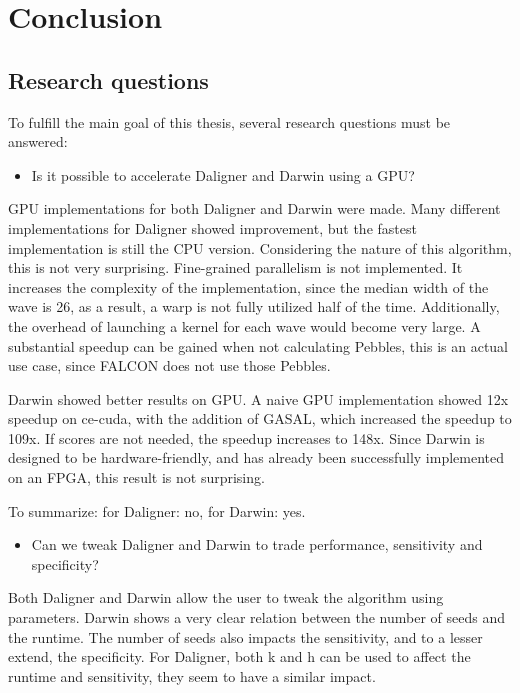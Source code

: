 \documentclass[../thesis.tex]{subfiles}
\begin{document}
\chapter{Conclusion}
\ifdefined\main
\else

\fi


% 

\section{Research questions}
To fulfill the main goal of this thesis, several research questions must be answered:

\begin{itemize}
\item Is it possible to accelerate Daligner and Darwin using a GPU?
\end{itemize}
GPU implementations for both Daligner and Darwin were made.
Many different implementations for Daligner showed improvement, but the fastest implementation is still the CPU version.
Considering the nature of this algorithm, this is not very surprising.
Fine-grained parallelism is not implemented.
It increases the complexity of the implementation, since the median width of the wave is 26, as a result, a warp is not fully utilized half of the time.
Additionally, the overhead of launching a kernel for each wave would become very large.
A substantial speedup can be gained when not calculating Pebbles, this is an actual use case, since FALCON does not use those Pebbles.

Darwin showed better results on GPU.
A naive GPU implementation showed 12x speedup on ce-cuda, with the addition of GASAL, which increased the speedup to 109x.
If scores are not needed, the speedup increases to 148x.
Since Darwin is designed to be hardware-friendly, and has already been successfully implemented on an FPGA, this result is not surprising.

To summarize: for Daligner: no, for Darwin: yes.


\begin{itemize}
\item Can we tweak Daligner and Darwin to trade performance, sensitivity and specificity?
\end{itemize}
Both Daligner and Darwin allow the user to tweak the algorithm using parameters.
Darwin shows a very clear relation between the number of seeds and the runtime.
The number of seeds also impacts the sensitivity, and to a lesser extend, the specificity.
For Daligner, both k and h can be used to affect the runtime and sensitivity, they seem to have a similar impact.
\end{document}
